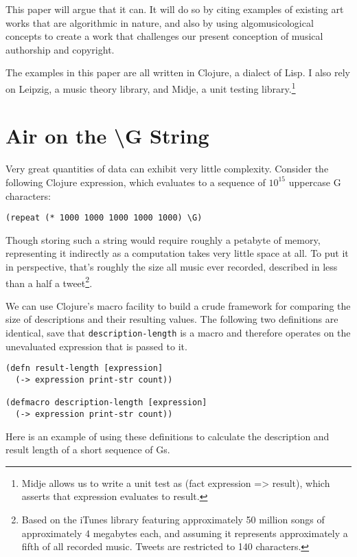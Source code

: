 \documentclass[numbers]{sigplanconf}
\begin{document}
This paper will argue that it can. It will do so by citing examples of existing art works that are algorithmic in nature, and
also by using algomusicological concepts to create a work that challenges our present conception of musical authorship and
copyright.

The examples in this paper are all written in Clojure, a dialect of Lisp. I also rely on Leipzig, a music theory library,
and Midje, a unit testing library.\footnote{Midje allows us to write a unit test as (fact expression => result),
which asserts that expression evaluates to result.}

\section{Air on the {\textbackslash}G String}
Very great quantities of data can exhibit very little complexity. Consider the following Clojure expression, which
evaluates to a sequence of $10^{15}$ uppercase G characters:

\begin{verbatim}
(repeat (* 1000 1000 1000 1000 1000) \G)
\end{verbatim}

Though storing such a string would require roughly a petabyte of memory, representing it indirectly as a computation
takes very little space at all. To put it in perspective, that's roughly the size all music ever recorded,
described in less than a half a tweet\footnote{Based on the iTunes library featuring approximately 50 million songs
of approximately 4 megabytes each, and assuming it represents approximately a fifth of all recorded music. Tweets are
restricted to 140 characters.}.

We can use Clojure's macro facility to build a crude framework for comparing the size of descriptions and their
resulting values. The following two definitions are identical, save that \verb|description-length| is a macro and therefore
operates on the unevaluated expression that is passed to it.

\begin{verbatim}
(defn result-length [expression]
  (-> expression print-str count))

(defmacro description-length [expression]
  (-> expression print-str count))
\end{verbatim}

Here is an example of using these definitions to calculate the description and result length of a short sequence of Gs.
\end{document}
